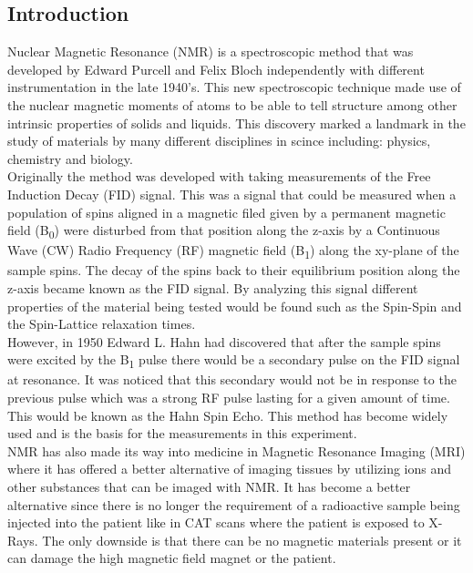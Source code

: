\documentclass{article}
\begin{document}
{\begin{multicols}{2}
\section{Introduction}
Nuclear Magnetic Resonance (NMR) is a spectroscopic method that was developed 
by Edward Purcell and Felix Bloch independently with different instrumentation 
in the late 1940's. This new spectroscopic technique made use of the nuclear 
magnetic moments of atoms to be able to tell structure among other intrinsic 
properties of solids and liquids. This discovery marked a landmark in the 
study of materials by many different disciplines in scince including: physics, 
chemistry and biology. 
\\
Originally the method was developed with taking measurements of the Free 
Induction Decay (FID) signal. This was a signal that could be measured when 
a population of spins aligned in a magnetic filed given by a permanent 
magnetic field (B\textsubscript{0}) were disturbed from that position along 
the z-axis by a Continuous Wave (CW) Radio Frequency (RF) magnetic field 
(B\textsubscript{1}) along the xy-plane of the sample spins. The decay of the 
spins back to their equilibrium position along the z-axis became known as the 
FID signal. By analyzing this signal different properties of the material 
being tested would be found such as the Spin-Spin and the Spin-Lattice 
relaxation times.
\\
However, in 1950 Edward L. Hahn had discovered that after the sample spins were excited by the B\textsubscript{1} pulse there would be a secondary pulse on the
FID signal at resonance. It was noticed that this secondary would not be in 
response to the previous pulse which was a strong RF pulse lasting for a given 
amount of time. This would be known as the Hahn Spin Echo. This method has 
become widely used and is the basis for the measurements in this experiment.
\\
NMR has also made its way into medicine in Magnetic Resonance Imaging (MRI) 
where it has offered a better alternative of imaging tissues by utilizing ions 
and other substances that can be imaged with NMR. It has become a better 
alternative since there is no longer the requirement of a radioactive sample 
being injected into the patient like in CAT scans where the patient is exposed 
to X-Rays. The only downside is that there can be no magnetic materials present 
or it can damage the high magnetic field magnet or the patient.

\end{multicols}}
\end{document}

